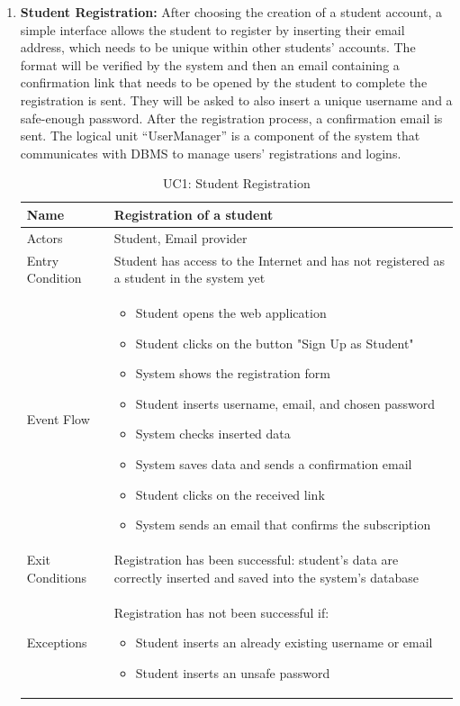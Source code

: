 \begin{enumerate}
   \item \textbf{Student Registration:}
After choosing the creation of a student account, a simple interface allows the student to register by inserting their email address, which needs to be unique within other students’ accounts. The format will be verified by the system and then an email containing a confirmation link that needs to be opened by the student to complete the registration is sent. They will be asked to also insert a unique username and a safe-enough password. After the registration process, a confirmation email is sent. The logical unit “UserManager” is a component of the system that communicates with DBMS to manage users’ registrations and logins.
   
   \begin{table}[H]
       \centering
       \begin{tabular}{|l|m{11cm}|}
        \hline
            Name & Registration of a student\\
        \hline
            Actors & Student, Email provider\\
        \hline
            Entry Condition & Student has access to the Internet and has not registered as a student in the system yet\\
        \hline
            Event Flow & 
            \begin{itemize}
                \item Student opens the web application
                \item Student clicks on the button "Sign Up as Student"
                \item System shows the registration form
                \item Student inserts username, email, and chosen password
                \item System checks inserted data
                \item System saves data and sends a confirmation email
                \item Student clicks on the received link
                \item System sends an email that confirms the subscription
            \end{itemize} \\
        \hline
            Exit Conditions & Registration has been successful: student's data are correctly inserted and saved into the system's database\\
        \hline
            Exceptions & Registration has not been successful if:
            \begin{itemize}
                \item Student inserts an already existing username or email
                \item Student inserts an unsafe password
            \end{itemize} \\
        \hline
       \end{tabular}
       \caption{UC1: Student Registration}
       \label{tab:uc1}
   \end{table}


\end{enumerate}
